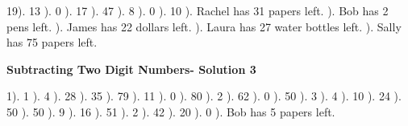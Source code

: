 \documentclass{article}%
\begin{document}
19). 13%
). 0%
). 17%
). 47%
). 8%
). 0%
). 10%
). Rachel has 31 papers left.%
). Bob has 2 pens left.%
). James has 22 dollars left.%
). Laura has 27 water bottles left.%
). Sally has 75 papers left.%
\newline%
\newpage%
\large%
\begin{center}%
\textbf{Subtracting Two Digit Numbers- Solution 3}%
\newline%
\end{center} \normalsize%
1). 1%
). 4%
). 28%
). 35%
). 79%
). 11%
). 0%
). 80%
). 2%
). 62%
). 0%
). 50%
). 3%
). 4%
). 10%
). 24%
). 50%
). 50%
). 9%
). 16%
). 51%
). 2%
). 42%
). 20%
). 0%
). Bob has 5 papers left.%
\newline%
\end{document}

